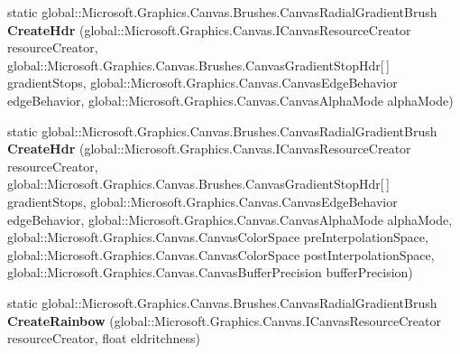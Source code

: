 \begin{DoxyCompactItemize}
\mbox{\label{class_microsoft_1_1_graphics_1_1_canvas_1_1_brushes_1_1_canvas_radial_gradient_brush_a56c87e8ee5b2516dfc061d3207cbba62}} 
static global\+::\+Microsoft.\+Graphics.\+Canvas.\+Brushes.\+Canvas\+Radial\+Gradient\+Brush {\bfseries Create\+Hdr} (global\+::\+Microsoft.\+Graphics.\+Canvas.\+I\+Canvas\+Resource\+Creator resource\+Creator, global\+::\+Microsoft.\+Graphics.\+Canvas.\+Brushes.\+Canvas\+Gradient\+Stop\+Hdr\mbox{[}$\,$\mbox{]} gradient\+Stops, global\+::\+Microsoft.\+Graphics.\+Canvas.\+Canvas\+Edge\+Behavior edge\+Behavior, global\+::\+Microsoft.\+Graphics.\+Canvas.\+Canvas\+Alpha\+Mode alpha\+Mode)
\item 
\mbox{\label{class_microsoft_1_1_graphics_1_1_canvas_1_1_brushes_1_1_canvas_radial_gradient_brush_a51c1cc7d4745f7d2f3e322b078cc04cb}} 
static global\+::\+Microsoft.\+Graphics.\+Canvas.\+Brushes.\+Canvas\+Radial\+Gradient\+Brush {\bfseries Create\+Hdr} (global\+::\+Microsoft.\+Graphics.\+Canvas.\+I\+Canvas\+Resource\+Creator resource\+Creator, global\+::\+Microsoft.\+Graphics.\+Canvas.\+Brushes.\+Canvas\+Gradient\+Stop\+Hdr\mbox{[}$\,$\mbox{]} gradient\+Stops, global\+::\+Microsoft.\+Graphics.\+Canvas.\+Canvas\+Edge\+Behavior edge\+Behavior, global\+::\+Microsoft.\+Graphics.\+Canvas.\+Canvas\+Alpha\+Mode alpha\+Mode, global\+::\+Microsoft.\+Graphics.\+Canvas.\+Canvas\+Color\+Space pre\+Interpolation\+Space, global\+::\+Microsoft.\+Graphics.\+Canvas.\+Canvas\+Color\+Space post\+Interpolation\+Space, global\+::\+Microsoft.\+Graphics.\+Canvas.\+Canvas\+Buffer\+Precision buffer\+Precision)
\item 
\mbox{\label{class_microsoft_1_1_graphics_1_1_canvas_1_1_brushes_1_1_canvas_radial_gradient_brush_a19932ca8ae9416ca37a762c1184257db}} 
static global\+::\+Microsoft.\+Graphics.\+Canvas.\+Brushes.\+Canvas\+Radial\+Gradient\+Brush {\bfseries Create\+Rainbow} (global\+::\+Microsoft.\+Graphics.\+Canvas.\+I\+Canvas\+Resource\+Creator resource\+Creator, float eldritchness)
\item 
\mbox{\label{class_microsoft_1_1_graphics_1_1_canvas_1_1_brushes_1_1_canvas_radial_gradient_brush_a9fc3b8b39e6337c070642178c6fb106c}} 

\end{DoxyCompactItemize}
